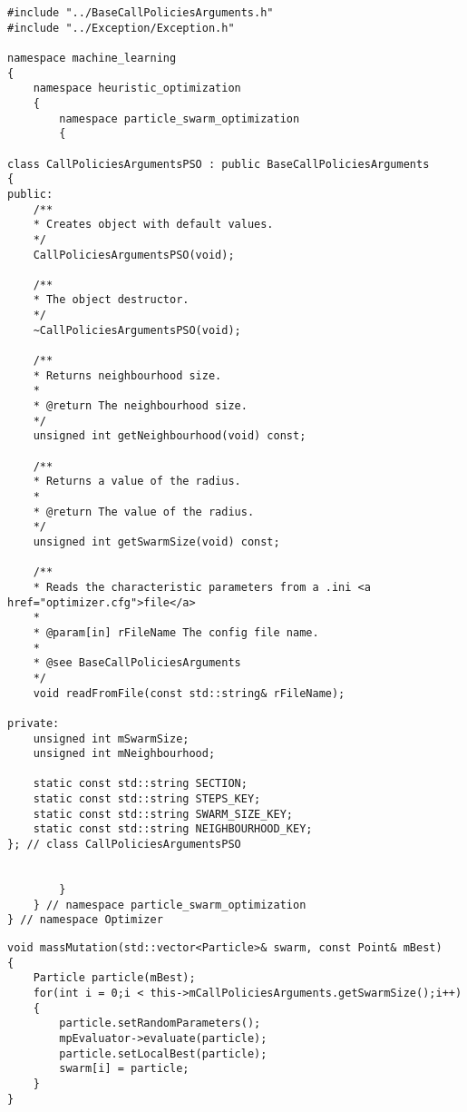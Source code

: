 \begin{lstlisting}
#include "../BaseCallPoliciesArguments.h"
#include "../Exception/Exception.h"

namespace machine_learning
{
    namespace heuristic_optimization
    {
        namespace particle_swarm_optimization
        {

class CallPoliciesArgumentsPSO : public BaseCallPoliciesArguments
{
public:
    /**
    * Creates object with default values.
    */
    CallPoliciesArgumentsPSO(void);

    /**
    * The object destructor.
    */
    ~CallPoliciesArgumentsPSO(void);

    /**
    * Returns neighbourhood size.
    *
    * @return The neighbourhood size.
    */
    unsigned int getNeighbourhood(void) const;

    /**
    * Returns a value of the radius.
    *
    * @return The value of the radius.
    */
    unsigned int getSwarmSize(void) const;

    /**
    * Reads the characteristic parameters from a .ini <a href="optimizer.cfg">file</a>
    *
    * @param[in] rFileName The config file name.
    *
    * @see BaseCallPoliciesArguments
    */
    void readFromFile(const std::string& rFileName);

private:
    unsigned int mSwarmSize;
    unsigned int mNeighbourhood;

    static const std::string SECTION;
    static const std::string STEPS_KEY;
    static const std::string SWARM_SIZE_KEY;
    static const std::string NEIGHBOURHOOD_KEY;
}; // class CallPoliciesArgumentsPSO


        }
    } // namespace particle_swarm_optimization
} // namespace Optimizer
\end{lstlisting}
    

\begin{lstlisting}
void massMutation(std::vector<Particle>& swarm, const Point& mBest)
{
    Particle particle(mBest);
    for(int i = 0;i < this->mCallPoliciesArguments.getSwarmSize();i++)
    {
        particle.setRandomParameters();
        mpEvaluator->evaluate(particle);
        particle.setLocalBest(particle);
        swarm[i] = particle;
    }
}
\end{lstlisting}



